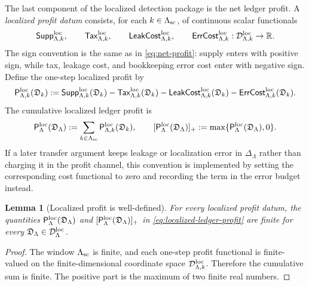\documentclass[11pt]{article}
\numberwithin{equation}{section}
\newtheorem{lemma}[theorem]{Lemma}
\newcommand{\R}{\mathbb R}
\begin{document}
The last component of the localized detection package is the net ledger
profit.  A \emph{localized profit datum} consists, for each
\(k\in\Lambda_{\rm sc}\), of continuous scalar functionals
\[
        \mathsf{Supp}_{\Lambda,k}^{\rm loc},\qquad
        \mathsf{Tax}_{\Lambda,k}^{\rm loc},\qquad
        \mathsf{LeakCost}_{\Lambda,k}^{\rm loc},\qquad
        \mathsf{ErrCost}_{\Lambda,k}^{\rm loc}
        :
        \mathcal D_{\Lambda,k}^{\rm loc}\to\R .
\]
The sign convention is the same as in \eqref{eq:net-profit}: supply enters
with positive sign, while tax, leakage cost, and bookkeeping error cost
enter with negative sign.  Define the one-step localized profit by
\[
        \mathsf P_{\Lambda,k}^{\rm loc}(\mathfrak D_k)
        :=
        \mathsf{Supp}_{\Lambda,k}^{\rm loc}(\mathfrak D_k)
        -
        \mathsf{Tax}_{\Lambda,k}^{\rm loc}(\mathfrak D_k)
        -
        \mathsf{LeakCost}_{\Lambda,k}^{\rm loc}(\mathfrak D_k)
        -
        \mathsf{ErrCost}_{\Lambda,k}^{\rm loc}(\mathfrak D_k).
\]
The cumulative localized ledger profit is
\begin{equation}\label{eq:localized-ledger-profit}
        \mathsf P_\Lambda^{\rm loc}(\mathfrak D_\Lambda)
        :=
        \sum_{k\in\Lambda_{\rm sc}}
        \mathsf P_{\Lambda,k}^{\rm loc}(\mathfrak D_k),
        \qquad
        [\mathsf P_\Lambda^{\rm loc}(\mathfrak D_\Lambda)]_+
        :=
        \max\{
        \mathsf P_\Lambda^{\rm loc}(\mathfrak D_\Lambda),0
        \}.
\end{equation}
If a later transfer argument keeps leakage or localization error in
\(\Delta_\Lambda\) rather than charging it in the profit channel, this
convention is implemented by setting the corresponding cost functional to
zero and recording the term in the error budget instead.

\begin{lemma}[Localized profit is well-defined]\label{lem:localized-ledger-profit}
For every localized profit datum, the quantities
\(\mathsf P_\Lambda^{\rm loc}(\mathfrak D_\Lambda)\) and
\([\mathsf P_\Lambda^{\rm loc}(\mathfrak D_\Lambda)]_+\) in
\eqref{eq:localized-ledger-profit} are finite for every
\(\mathfrak D_\Lambda\in\mathcal D_\Lambda^{\rm loc}\).
\end{lemma}

\begin{proof}
The window \(\Lambda_{\rm sc}\) is finite, and each one-step profit
functional is finite-valued on the finite-dimensional coordinate space
\(\mathcal D_{\Lambda,k}^{\rm loc}\).  Therefore the cumulative sum is
finite.  The positive part is the maximum of two finite real numbers.
\end{proof}
\end{document}

